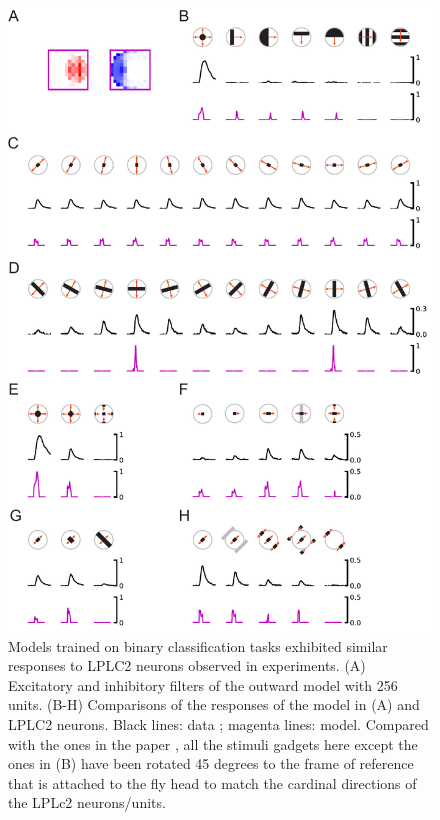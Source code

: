 \documentclass[9pt,lineno]{elife}
\begin{document}
\begin{figure}
\includegraphics[width=0.8\linewidth]{figures/replication_paper.pdf}
\caption{Models trained on binary classification tasks exhibited similar responses to LPLC2 neurons observed in experiments. (A) Excitatory and inhibitory filters of the outward model with 256 units. (B-H) Comparisons of the responses of the model in (A) and LPLC2 neurons. Black lines: data \citep{klapoetke2017ultra}; magenta lines: model. Compared with the ones in the paper \citep{klapoetke2017ultra}, all the stimuli gadgets here except the ones in (B) have been rotated 45 degrees to the frame of reference that is attached to the fly head to match the cardinal directions of the LPLc2 neurons/units.}
\label{fig:replication}

\end{figure}
\end{document}

